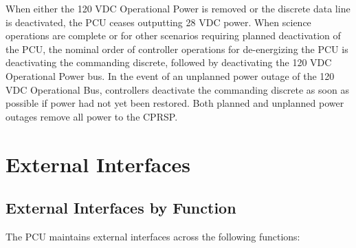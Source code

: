 When either the 120 \gls{VDC} Operational Power is removed or the discrete data line is deactivated, the \gls{PCU} ceases outputting 28 \gls{VDC} power. When science operations are complete or for other scenarios requiring planned deactivation of the \gls{PCU}, the nominal order of controller operations for de-energizing the \gls{PCU} is deactivating the commanding discrete, followed by deactivating the 120 \gls{VDC} Operational Power bus. In the event of an unplanned power outage of the 120 \gls{VDC} Operational Bus, controllers deactivate the commanding discrete as soon as possible if power had not yet been restored. Both planned and unplanned power outages remove all power to the \gls{CPRSP}.

\chapter{External Interfaces  }
\label{interfaces}

\section{External Interfaces by Function}
\label{externalinterfacesbyfunction}

The \gls{PCU} maintains external interfaces across the following functions:

